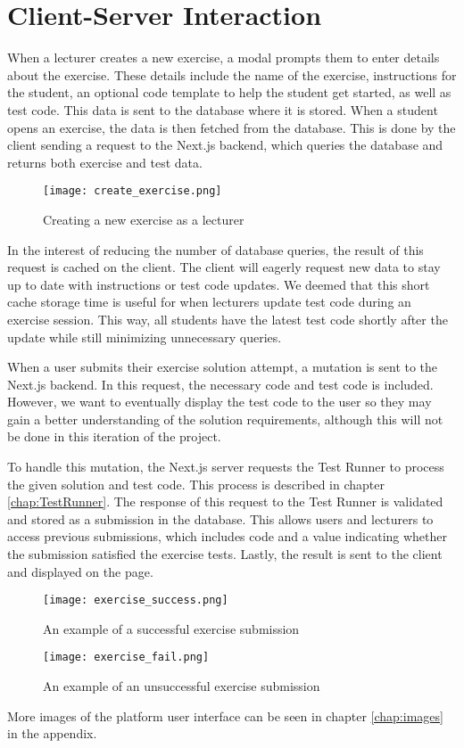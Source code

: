 \section{Client-Server Interaction}
When a lecturer creates a new exercise, a modal prompts them to enter details about the exercise.
These details include the name of the exercise, instructions for the student, an optional code template to help the student get started, as well as test code.
This data is sent to the database where it is stored.
When a student opens an exercise, the data is then fetched from the database.
This is done by the client sending a request to the Next.js backend, which queries the database and returns both exercise and test data.

\begin{figure}[H]
    \centering
    \texttt{[image: create\_exercise.png]}
    \caption{Creating a new exercise as a lecturer}
    \label{fig:create_exercise}
\end{figure}

In the interest of reducing the number of database queries, the result of this request is cached on the client.
The client will eagerly request new data to stay up to date with instructions or test code updates.
We deemed that this short cache storage time is useful for when lecturers update test code during an exercise session.
This way, all students have the latest test code shortly after the update while still minimizing unnecessary queries.

When a user submits their exercise solution attempt, a mutation is sent to the Next.js backend.
In this request, the necessary code and test code is included.
However, we want to eventually display the test code to the user so they may gain a better understanding of the solution requirements, although this will not be done in this iteration of the project.

To handle this mutation, the Next.js server requests the Test Runner to process the given solution and test code.
This process is described in chapter \ref{chap:TestRunner}.
The response of this request to the Test Runner is validated and stored as a submission in the database.
This allows users and lecturers to access previous submissions, which includes code and a value indicating whether the submission satisfied the exercise tests.
Lastly, the result is sent to the client and displayed on the page.

\begin{figure}[H]
	\texttt{[image: exercise\_success.png]}
	\centering
	\caption{An example of a successful exercise submission}
	\label{fig:exercise_success}
\end{figure}

\begin{figure}[H]
	\texttt{[image: exercise\_fail.png]}
	\centering
	\caption{An example of an unsuccessful exercise submission}
	\label{fig:exercise_fail}
\end{figure}

More images of the platform user interface can be seen in chapter \ref{chap:images} in the appendix.
